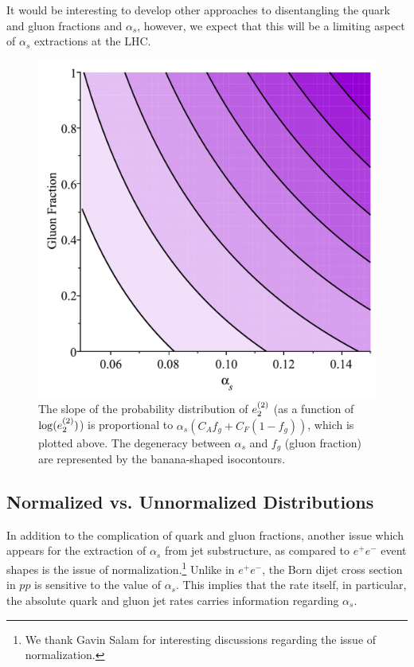 It would be interesting to develop other approaches to disentangling the quark and gluon fractions and $\alpha_s$, however, we expect that this will be a limiting aspect of $\alpha_s$ extractions at the LHC.


\begin{figure}[h!]
\begin{center}
\includegraphics[width = 0.4\columnwidth]{figures/Degeneracy}
\end{center}
\caption{The slope of the probability distribution of $e_{2}^{(2)}$ (as a function of $\log(e_{2}^{(2)})$) is proportional to $\alpha_s(C_Af_g+C_F(1-f_g))$, which is plotted above.  The degeneracy between $\alpha_s$ and $f_g$ (gluon fraction) are represented by the banana-shaped isocontours. }
\label{fig:analyticbanana}
\end{figure}


\subsection{Normalized vs. Unnormalized Distributions}

In addition to the complication of quark and gluon fractions, another issue which appears for the extraction of $\alpha_s$ from jet substructure, as compared to $e^+e^-$ event shapes is the issue of normalization.\footnote{We thank Gavin Salam for interesting discussions regarding the issue of normalization.} Unlike in $e^+e^-$, the Born dijet cross section in $pp$ is sensitive to the value of $\alpha_s$. This implies that the rate itself, in particular, the absolute quark and gluon jet rates carries information regarding $\alpha_s$. 

